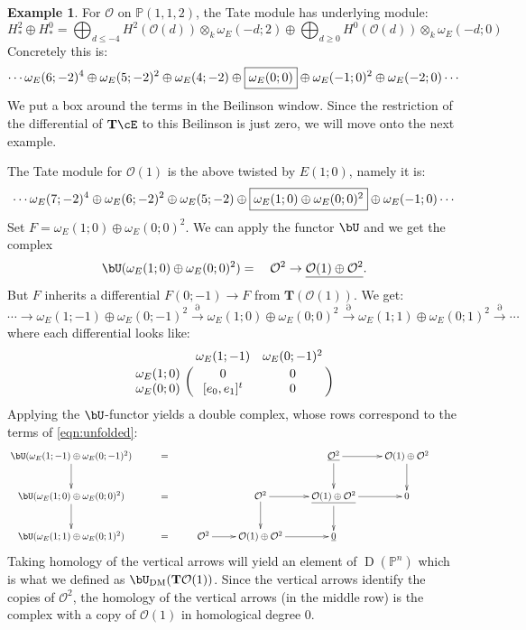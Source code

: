 \documentclass[12pt]{amsart}
\theoremstyle{definition}
\newtheorem{example}[lemma]{Example}
\theoremstyle{remark}
\newcommand{\Tate}{{\mathbf{T}}}
\newcommand{\PP}{\mathbb P}
\newcommand{\cO}{{\mathcal O}}
\def\DD{\operatorname{D}}
\def\DM{\operatorname{DM}}
\begin{document}
\begin{example}
For $\cO$ on $\PP(1,1,2)$, the Tate module has underlying module:
\[
H^2_* \oplus H^0_* =  \bigoplus_{d\leq -4} H^2(\cO(d)) \otimes_k \omega_E(-d;2) \oplus \bigoplus_{d \geq 0}  H^0(\cO(d)) \otimes_k \omega_E(-d;0)
\]
Concretely this is:
\[
\cdots \omega_E(6;-2)^4\oplus  \omega_E(5;-2)^2\oplus \omega_E(4;-2) \oplus  \framebox{$\omega_E(0;0)$} \oplus  \omega_E(-1;0)^2\oplus \omega_E(-2;0)\cdots
\]
We put a box around the terms in the Beilinson window.  Since the restriction of the differential of $\Tate \cE$ to this Beilinson is just zero, we will move onto the next example.

The Tate module for $\cO(1)$ is the above twisted by $E(1;0)$, namely it is:
\[
\cdots \omega_E(7;-2)^4\oplus  \omega_E(6;-2)^2\oplus \omega_E(5;-2) \oplus  \framebox{$\omega_E(1;0) \oplus  \omega_E(0;0)^2$}\oplus \omega_E(-1;0)\cdots
\]
Set $F=\omega_E(1;0) \oplus  \omega_E(0;0)^2$.  We can apply the functor $\bU$ and we get the complex
\[
\bU(\omega_E(1;0) \oplus  \omega_E(0;0)^2) = \quad \cO^2 \to \underline{\cO(1) \oplus \cO^2}.
\]
But $F$ inherits a differential $F(0;-1)\to F$ from $\Tate(\cO(1))$.  We get:
\begin{equation}\label{eqn:unfolded}
\cdots \to \omega_E(1;-1) \oplus  \omega_E(0;-1)^2 \overset{\partial}{\to}\omega_E(1;0) \oplus  \omega_E(0;0)^2\overset{\partial}{\to}\omega_E(1;1) \oplus  \omega_E(0;1)^2 \overset{\partial}{\to}\cdots
\end{equation}
where each differential looks like:
\[
\bordermatrix{
&\omega_E(1;-1)&\omega_E(0;-1)^2\cr
\omega_E(1;0)&0&0\cr
\omega_E(0;0)&[e_0,e_1]^t&0\cr
}
\]
Applying the $\bU$-functor yields a double complex, whose rows correspond to the terms of \eqref{eqn:unfolded}:
\[
\xymatrix{
\bU(\omega_E(1;-1) \oplus  \omega_E(0;-1)^2) \ar[d]&= &&&\underline{\cO^2}\ar[r]\ar[d]& {\cO(1) \oplus \cO^2}\ar[d]\\
\bU(\omega_E(1;0) \oplus  \omega_E(0;0)^2)  \ar[d]&= & &\cO^2\ar[r]\ar[d]&\underline{\cO(1) \oplus \cO^2}\ar[r] \ar[d]&0&\\
\bU(\omega_E(1;1) \oplus  \omega_E(0;1)^2) &= &\cO^2\ar[r]&{\cO(1) \oplus \cO^2}\ar[r] &\underline{0}&\\
}
\]
Taking homology of the vertical arrows will yield an element of $\DD(\PP^n)$ which is what we defined as $\bU_{\DM}(\Tate \cO(1))$.  Since the vertical arrows identify the copies of $\cO^2$, the homology of the vertical arrows (in the middle row) is the complex with a copy of $\cO(1)$ in homological degree $0$.
\end{example}
\end{document}
